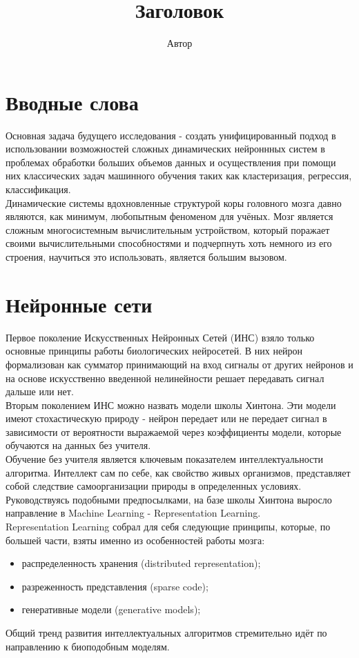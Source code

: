 \documentclass[a4paper,10pt]{article}
\title{Заголовок}
\author{Автор}
\begin{document}
\section*{Вводные слова}
\indent
\indent Основная задача будущего исследования - создать унифицированный подход в использовании возможностей сложных динамических нейроннных систем в проблемах обработки больших объемов данных и осуществления при помощи них классических задач машинного обучения таких как кластеризация, регрессия, классификация.\\
\indent Динамические системы вдохновленные структурой коры головного мозга давно являются, как минимум, любопытным феноменом для учёных. Мозг является сложным многосистемным вычислительным устройством, который поражает своими вычислительными способностями и подчерпнуть хоть немного из его строения, научиться это использовать, является большим вызовом.\\

\section*{Нейронные сети}
\indent
\indent Первое поколение Искусственных Нейронных Сетей (ИНС) взяло только основные принципы работы биологических нейросетей. В них нейрон формализован как сумматор принимающий на вход сигналы от других нейронов и на основе искусственно введенной нелинейности решает передавать сигнал дальше или нет.\\
\indent Вторым поколением ИНС можно назвать модели школы Хинтона. Эти модели имеют стохастическую природу - нейрон передает или не передает сигнал в зависимости от вероятности выражаемой через коэффициенты модели, которые обучаются на данных без учителя.\\ 
\indent Обучение без учителя является ключевым показателем интеллектуальности алгоритма. Интеллект сам по себе, как свойство живых организмов, представляет собой следствие самоорганизации природы в определенных условиях. Руководствуясь подобными предпосылками, на базе школы Хинтона выросло направление в Machine Learning - Representation Learning.\\
\indent Representation Learning собрал для себя следующие принципы, которые, по большей части, взяты именно из особенностей работы мозга: 
\begin{itemize}
\item распределенность хранения (distributed representation);
\item разреженность представления (sparse code);
\item генеративные модели (generative models);
\end{itemize}
Общий тренд развития интеллектуальных алгоритмов стремительно идёт по направлению к биоподобным моделям.
\end{document}
